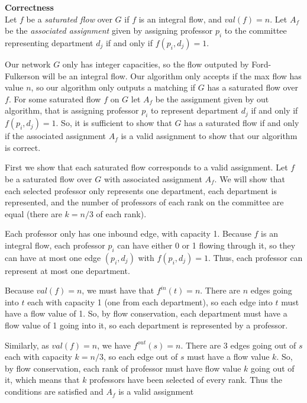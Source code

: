 \documentclass[11pt]{exam}
\begin{document}
\noindent \textbf{Correctness}\\
Let $ f $ be a \textit{saturated flow} over $ G $ if $ f $ is an
integral flow, and $ \mathit{val}(f) = n $. Let $ A_f $ be the
\textit{associated assignment} given by assigning professor $ p_i $
to the committee representing department $ d_j $ if and only if $
f(p_i, d_j) = 1$.

Our network $ G $ only has integer capacities, so the flow outputed
by Ford-Fulkerson will be an integral flow. Our algorithm only
accepts if the max flow has value $ n $, so our algorithm only
outputs a matching if $ G $ has a saturated flow over $ f $. For some
saturated flow $ f $ on $ G $ let $ A_f $ be the assignment given by
out algorithm, that is assigning professor $ p_i $ to represent
department $ d_j $ if and only if $ f(p_i, d_j) = 1 $. So, it is
sufficient to show that $ G $ has a saturated flow if and only if the
associated assignment $ A_f $ is a valid assignment to show that our
algorithm is correct.

First we show that each saturated flow corresponds to a valid
assignment. Let $ f $ be a saturated flow over $ G $ with associated
assignment $ A_f $. We will show that each selected professor only
represents one department, each department is represented, and the
number of professors of each rank on the committee are equal (there
are $ k = n/3$ of each rank).

Each professor only has one inbound edge, with capacity 1. Because $
f $ is an integral flow, each professor $ p_i $ can have either 0 or
1 flowing through it, so they can have at most one edge $ (p_i, d_j)
$ with $ f(p_i, d_j) = 1 $. Thus, each professor can represent at
most one department.

Because $ \mathit{val}(f) = n $, we must have that $ f^{
\mathit{in}}( t )= n $. There are $ n $ edges going into $ t $ each
with capacity 1 (one from each department), so each edge into $ t $
must have a flow value of 1. So, by flow conservation, each
department must have a flow value of 1 going into it, so each
department is represented by a professor.

Similarly, as $ \mathit{val}(f) = n $, we have $ f^{ \mathit{out}}
(s) = n$. There are $ 3 $ edges going out of $ s $ each with capacity
$ k = n/3 $, so each edge out of $ s $ must have a flow value $ k $.
So, by flow conservation, each rank of professor must have flow value
$ k $ going out of it, which means that $ k $ professors have been
selected of every rank. Thus the conditions are satisfied and $ A_f $
is a valid assignment
\end{document}
